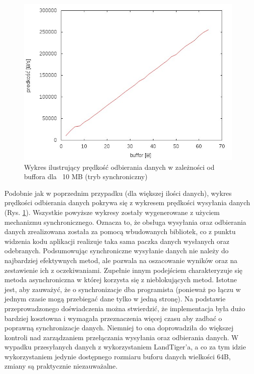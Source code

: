 \documentclass{BscUS}
\begin{document}
\begin{figure}[h]
{
\centering
\includegraphics[width=1\textwidth]{./img/S_10737420Receive}
\caption{Wykres ilustrujący prędkość odbierania danych w zależności od buffora dla ~10 MB (tryb synchroniczny)}
\label{fig:S_10737420Receive}
}
\end{figure}
\noindent Podobnie jak w poprzednim przypadku (dla większej ilości danych), wykres prędkości odbierania danych pokrywa się z wykresem prędkości wysyłania danych (Rys. \ref{fig:S_10737420Receive}).
\newline
\indent Wszystkie powyższe wykresy zostały wygenerowane z użyciem mechanizmu synchronicznego. Oznacza to, że obsługa wysyłania oraz odbierania danych zrealizowana została za pomocą wbudowanych bibliotek, co z punktu widzenia kodu aplikacji  realizuje taka sama paczka danych wysłanych oraz odebranych. Podsumowując synchroniczne wysyłanie danych nie należy do najbardziej efektywnych metod, ale pozwala na oszacowanie wyników oraz na zestawienie ich z oczekiwaniami.
\newline
\indent Zupełnie innym podejściem charakteryzuje się metoda asynchroniczna w której korzysta się z nieblokujących metod. Istotne jest, aby zauważyć, że o synchronizacje dba programista (ponieważ po łączu w jednym czasie mogą przebiegać dane tylko w jedną stronę). Na podstawie przeprowadzonego doświadczenia można stwierdzić, że implementacja była dużo bardziej kosztowna i wymagała przeznaczenia więcej czasu aby zadbać o poprawną synchronizacje danych. Niemniej to ona doprowadziła do większej kontroli nad zarządzaniem przełączania wysyłania oraz odbierania danych. W wypadku przesyłanych danych z wykorzystaniem LandTiger'a, a co za tym idzie wykorzystaniem jedynie dostępnego rozmiaru buforu danych wielkości 64B, zmiany są praktycznie niezauważalne.
\end{document}
